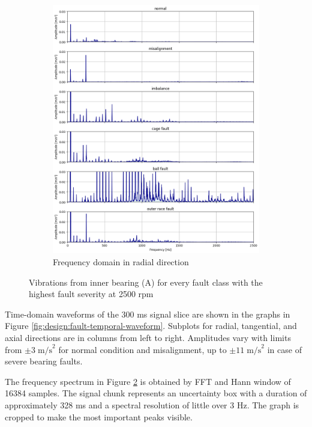 \begin{figure}[h]
\begin{subfigure}[b]{0.50\textwidth}
        \includegraphics[width=\textwidth]{assets/results/eda/mafaulda-faults.png}
        \caption{Frequency domain in radial direction}
        \label{fig:design:fault-spectral-waveform}
    \end{subfigure}
    \caption{Vibrations from inner bearing (A) for every fault class with the highest fault severity at 2500 rpm}
\end{figure}

Time-domain waveforms of the 300 ms signal slice are shown in the graphs in Figure \ref{fig:design:fault-temporal-waveform}. Subplots for radial, tangential, and axial directions are in columns from left to right. Amplitudes vary with limits from $\pm 3\; \mathrm{m/s}^2$ for normal condition and misalignment, up to $\pm 11\;\mathrm{m/s}^2$ in case of severe bearing faults.

The frequency spectrum in Figure \ref{fig:design:fault-spectral-waveform} is obtained by FFT and Hann window of 16384 samples. The signal chunk represents an uncertainty box with a duration of approximately 328 ms and a spectral resolution of little over 3 Hz. The graph is cropped to make the most important peaks visible.


